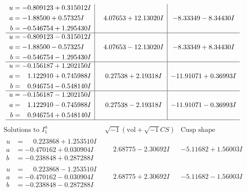 \documentclass[1p]{elsarticle_modified}
\theoremstyle{definition}
\newcommand{\I}{\sqrt{-1}}
\begin{document}
$$\begin{array}{c|c|c}
\begin{aligned}
u &= -0.809123 + 0.315012 I \\
a &= -1.88500 + 0.57325 I \\
b &= -0.546754 + 1.295430 I\end{aligned}
 & \phantom{-}4.07653 + 12.13020 I & -8.33349 - 8.34430 I \\ \hline\begin{aligned}
u &= -0.809123 - 0.315012 I \\
a &= -1.88500 - 0.57325 I \\
b &= -0.546754 - 1.295430 I\end{aligned}
 & \phantom{-}4.07653 - 12.13020 I & -8.33349 + 8.34430 I \\ \hline\begin{aligned}
u &= -0.156187 + 1.202150 I \\
a &= \phantom{-}1.122910 + 0.745988 I \\
b &= \phantom{-}0.946754 - 0.548140 I\end{aligned}
 & \phantom{-}0.27538 + 2.19318 I & -11.91071 + 0.36993 I \\ \hline\begin{aligned}
u &= -0.156187 - 1.202150 I \\
a &= \phantom{-}1.122910 - 0.745988 I \\
b &= \phantom{-}0.946754 + 0.548140 I\end{aligned}
 & \phantom{-}0.27538 - 2.19318 I & -11.91071 - 0.36993 I\\
 \hline 
 \end{array}$$\newpage$$\begin{array}{c|c|c}  
\text{Solutions to }I^u_{1}& \I (\text{vol} + \sqrt{-1}CS) & \text{Cusp shape}\\
 \hline 
\begin{aligned}
u &= \phantom{-}0.223868 + 1.253510 I \\
a &= -0.470162 + 0.030904 I \\
b &= -0.238848 + 0.287288 I\end{aligned}
 & \phantom{-}2.68775 - 2.30692 I & -5.11682 + 1.56003 I \\ \hline\begin{aligned}
u &= \phantom{-}0.223868 - 1.253510 I \\
a &= -0.470162 - 0.030904 I \\
b &= -0.238848 - 0.287288 I\end{aligned}
 & \phantom{-}2.68775 + 2.30692 I & -5.11682 - 1.56003 I \\ \hline\begin{aligned}

\end{aligned}
\end{array}$$
\end{document}
